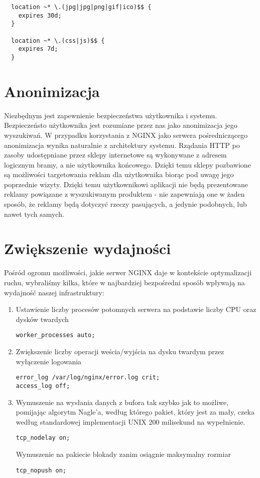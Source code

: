\begin{lstlisting}
  location ~* \.(jpg|jpg|png|gif|ico)$$ {
    expires 30d;
  }
  
  location ~* \.(css|js)$$ {
    expires 7d;
  }
\end{lstlisting}

\section{Anonimizacja}
Niezbędnym jest zapewnienie bezpieczeństwa użytkownika i systemu.
Bezpieczeństo użytkownika jest rozumiane przez nas jako anonimizacja jego wyszukiwań. W przypadku korzystania z NGINX jako serwera pośredniczącego anonimizacja wynika naturalnie z architektury systemu.
Rządania HTTP po zasoby udostępniane przez sklepy internetowe są wykonywane z adresem logicznym bramy, a nie użytkownika końcowego.
Dzięki temu sklepy pozbawione są możliwości targetowania reklam dla użytkownika  biorąc pod uwagę jego poprzednie wizyty. Dzięki temu użytkownikowi aplikacji nie będą prezentowane reklamy powiązane z wyszukiwanym produktem - nie zapewniają one w żaden sposób, że reklamy będą dotyczyć rzeczy pasujących, a jedynie podobnych, lub nawet tych samych.

\section{Zwiększenie wydajności}
Pośród ogromu możliwości, jakie serwer NGINX daje w kontekście optymalizacji ruchu, wybraliśmy kilka, które w najbardziej bezpośredni sposób wpływają na wydajność naszej infrastruktury:

\begin{enumerate}
\item
Ustawienie liczby procesów potomnych serwera na podstawie liczby CPU oraz dysków twardych
\begin{lstlisting}
worker_processes auto;
\end{lstlisting}
\item
Zwiększenie liczby operacji weścia/wyjścia na dysku twardym przez wyłączenie logowania
\begin{lstlisting}
error_log /var/log/nginx/error.log crit;
access_log off;
\end{lstlisting}
\item
Wymuszenie na  wysłania danych z bufora tak szybko jak to możliwe, pomijając algorytm Nagle'a, według którego pakiet, który jest za mały, czeka według standardowej implementacji UNIX 200 milisekund na wypełnienie.
\begin{lstlisting}
tcp_nodelay on;
\end{lstlisting}
Wymuszenie na pakiecie blokady zanim osiągnie maksymalny rozmiar
\begin{lstlisting}
tcp_nopush on;
\end{lstlisting}
\end{enumerate}

